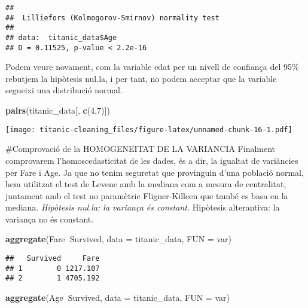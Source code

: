 \documentclass[]{article}
\newenvironment{Shaded}{\begin{snugshade}}{\end{snugshade}}
\newcommand{\DataTypeTok}[1]{\textcolor[rgb]{0.13,0.29,0.53}{#1}}
\newcommand{\DecValTok}[1]{\textcolor[rgb]{0.00,0.00,0.81}{#1}}
\newcommand{\KeywordTok}[1]{\textcolor[rgb]{0.13,0.29,0.53}{\textbf{#1}}}
\newcommand{\NormalTok}[1]{#1}
\newcommand{\OperatorTok}[1]{\textcolor[rgb]{0.81,0.36,0.00}{\textbf{#1}}}
\begin{document}
\begin{verbatim}
## 
##  Lilliefors (Kolmogorov-Smirnov) normality test
## 
## data:  titanic_data$Age
## D = 0.11525, p-value < 2.2e-16
\end{verbatim}

Podem veure novament, com la variable edat per un nivell de confiança
del 95\% rebutjem la hipòtesis nul.la, i per tant, no podem acceptar que
la variable segueixi una distribució normal.

\begin{Shaded}
\begin{Highlighting}[]
\KeywordTok{pairs}\NormalTok{(titanic_data[, }\KeywordTok{c}\NormalTok{(}\DecValTok{4}\NormalTok{,}\DecValTok{7}\NormalTok{)])}
\end{Highlighting}
\end{Shaded}

\texttt{[image: titanic-cleaning\_files/figure-latex/unnamed-chunk-16-1.pdf]}

\#Comprovació de la HOMOGENEITAT DE LA VARIANCIA Finalment comprovarem
l'homoscedasticitat de les dades, és a dir, la igualtat de variàncies
per Fare i Age. Ja que no tenim seguretat que provinguin d'una població
normal, hem utilitzat el test de Levene amb la mediana com a mesura de
centralitat, juntament amb el test no paramètric Fligner-Killeen que
també es basa en la mediana. \emph{Hipòtesis nul.la: la variança és
constant. }Hipòtesis alterantiva: la variança no és constant.

\begin{Shaded}
\begin{Highlighting}[]
\KeywordTok{aggregate}\NormalTok{(Fare}\OperatorTok{~}\NormalTok{Survived, }\DataTypeTok{data =}\NormalTok{ titanic_data, }\DataTypeTok{FUN =}\NormalTok{ var)}
\end{Highlighting}
\end{Shaded}

\begin{verbatim}
##   Survived     Fare
## 1        0 1217.107
## 2        1 4705.192
\end{verbatim}

\begin{Shaded}
\begin{Highlighting}[]
\KeywordTok{aggregate}\NormalTok{(Age}\OperatorTok{~}\NormalTok{Survived, }\DataTypeTok{data =}\NormalTok{ titanic_data, }\DataTypeTok{FUN =}\NormalTok{ var)}
\end{Highlighting}
\end{Shaded}
\end{document}
